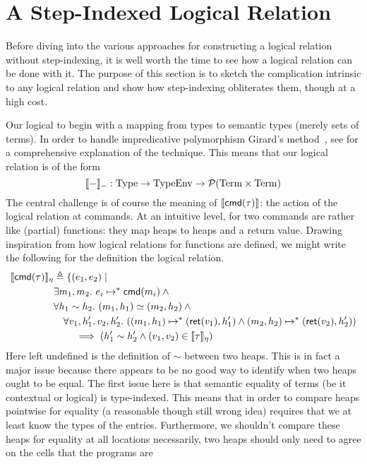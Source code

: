 \section{A Step-Indexed Logical Relation}\label{sec:steps}

Before diving into the various approaches for constructing a logical
relation without step-indexing, it is well worth the time to see how
a logical relation can be done with it. The purpose of this section is
to sketch the complication intrinsic to any logical relation and show
how step-indexing obliterates them, though at a high cost.

Our logical to begin with a mapping from types to semantic types
(merely sets of terms). In order to handle impredicative polymorphism
Girard's method~\citep{Girard:71,Girard:72}, see \citet{TODO-PFPL} for
a comprehensive explanation of the technique. This means that our
logical relation is of the form
\[
  \llbracket - \rrbracket_{-} : \mathrm{Type} \to \mathrm{TypeEnv} \to \mathcal{P}(\mathrm{Term} \times \mathrm{Term})
\]
The central challenge is of course the meaning of $\llbracket \mathsf{cmd}(\tau) \rrbracket$:
the action of the logical relation at commands. At an intuitive level,
for two commands are rather like (partial) functions: they map heaps to heaps
and a return value. Drawing inspiration from how logical relations for
functions are defined, we might write the following for the definition
the logical relation.
\begin{align*}
  \llbracket \mathsf{cmd}(\tau) \rrbracket_\eta& \triangleq \{(e_1, e_2) \mid\\
  &\exists m_1, m_2.\ e_i \mapsto^* \mathsf{cmd}(m_i) \land{}\\
  &\forall h_1 \sim h_2.
  \ (m_1, h_1) \simeq (m_2, h_2) \land{}\\
  &\quad \forall v_1, h_1', v_2, h_2'.
  \ ((m_1, h_1) \mapsto^{*} (\mathsf{ret}(v_1), h_1') \land (m_2, h_2) \mapsto^{*} (\mathsf{ret}(v_2), h_2'))\\
  &\qquad \implies (h_1' \sim h_2' \land (v_1, v_2) \in \llbracket \tau \rrbracket_\eta)
\end{align*}
Here left undefined is the definition of $\sim$ between two
heaps. This is in fact a major issue because there appears to be no
good way to identify when two heaps ought to be equal. The first issue
here is that semantic equality of terms (be it contextual or logical)
is type-indexed. This means that in order to compare heaps pointwise
for equality (a reasonable though still wrong idea) requires that we
at least know the types of the entries. Furthermore, we shouldn't
compare these heaps for equality at all locations necessarily, two
heaps should only need to agree on the cells that the programs are
